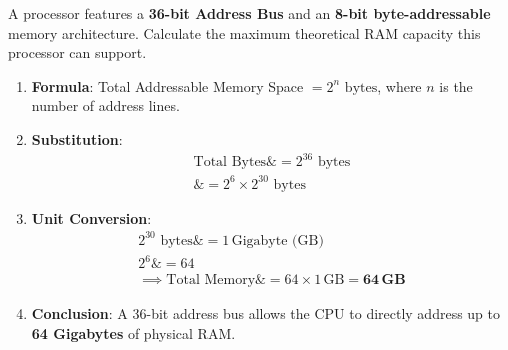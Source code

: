 \begin{example}
A processor features a \textbf{36-bit Address Bus} and an \textbf{8-bit byte-addressable} memory architecture. Calculate the maximum theoretical RAM capacity this processor can support.

\begin{solutionbox}
\begin{enumerate}
    \item \textbf{Formula}: Total Addressable Memory Space $= 2^n \text{ bytes}$, where $n$ is the number of address lines.
    \item \textbf{Substitution}:
    \begin{align*}
        \text{Total Bytes} \&= 2^{36} \text{ bytes} \\
        \&= 2^6 \times 2^{30} \text{ bytes}
    \end{align*}
    \item \textbf{Unit Conversion}:
    \begin{align*}
        2^{30} \text{ bytes} \&= 1\,\text{Gigabyte (GB)} \\
        2^6 \&= 64 \\
        \implies \text{Total Memory} \&= 64 \times 1\,\text{GB} = \mathbf{64\,\text{GB}}
    \end{align*}
    \item \textbf{Conclusion}: A 36-bit address bus allows the CPU to directly address up to \textbf{64 Gigabytes} of physical RAM.
\end{enumerate}
\end{solutionbox}
\end{example}

